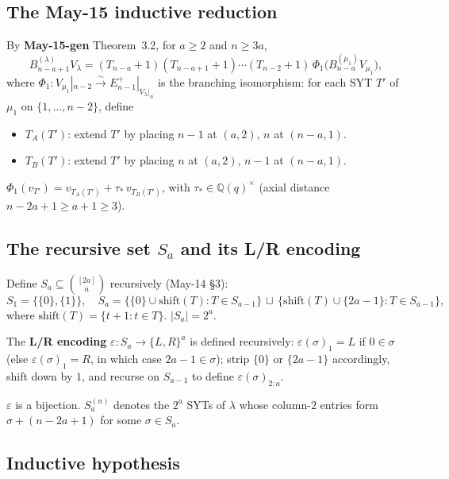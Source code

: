 \documentclass[11pt]{article}
\theoremstyle{definition}
\begin{document}
\subsection{The May-15 inductive reduction}

By \textbf{May-15-gen} Theorem~3.2, for $a\ge 2$ and $n\ge 3a$,
\begin{equation}\label{eq:gen-reduction}
   B_{n-a+1}^{(\lambda)}V_\lambda
   = (T_{n-a}{+}1)(T_{n-a+1}{+}1)\cdots(T_{n-2}{+}1)\,
   \Phi_1\big(B_{n-a}^{(\mu_1)} V_{\mu_1}\big),
\end{equation}
where $\Phi_1:V_{\mu_1}|_{n-2}\xrightarrow{\sim}E_{n-1}^+|_{V_\lambda|_n}$
is the branching isomorphism:
for each SYT $T'$ of $\mu_1$ on $\{1,\ldots,n-2\}$, define
\begin{itemize}[leftmargin=2em,topsep=0.3em,itemsep=0.2em]
\item $T_A(T')$: extend $T'$ by placing $n-1$ at $(a,2)$, $n$ at $(n-a,1)$.
\item $T_B(T')$: extend $T'$ by placing $n$ at $(a,2)$, $n-1$ at $(n-a,1)$.
\end{itemize}
$\Phi_1(v_{T'})=v_{T_A(T')}+\tau_*\,v_{T_B(T')}$, with
$\tau_*\in\mathbb{Q}(q)^\times$ (axial distance $n-2a+1\ge a+1\ge 3$).

\subsection{The recursive set $S_a$ and its L/R encoding}\label{sec:Sa}

Define $S_a\subseteq\binom{[2a]}{a}$ recursively (May-14 \S3):
\[
   S_1=\{\{0\},\{1\}\},\quad
   S_a=\big\{\{0\}\cup\mathrm{shift}(T):T\in S_{a-1}\big\}
   \,\sqcup\,
   \big\{\mathrm{shift}(T)\cup\{2a{-}1\}:T\in S_{a-1}\big\},
\]
where $\mathrm{shift}(T)=\{t+1:t\in T\}$.  $|S_a|=2^a$.

The \textbf{L/R encoding} $\varepsilon:S_a\to\{L,R\}^a$ is defined
recursively: $\varepsilon(\sigma)_1=L$ if $0\in\sigma$ (else
$\varepsilon(\sigma)_1=R$, in which case $2a-1\in\sigma$); strip
$\{0\}$ or $\{2a-1\}$ accordingly, shift down by $1$, and recurse on
$S_{a-1}$ to define $\varepsilon(\sigma)_{2:a}$.

$\varepsilon$ is a bijection.  $S_a^{(n)}$ denotes the
$2^a$ SYTs of $\lambda$ whose column-$2$ entries form
$\sigma+(n-2a+1)$ for some $\sigma\in S_a$.

\subsection{Inductive hypothesis}\label{sec:IH}
\end{document}
